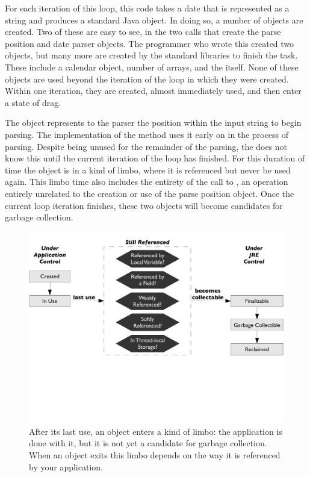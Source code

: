 For each iteration of this loop, this code takes a date that is represented as a
string and produces a standard Java  object. In doing so, a number of
objects are created. Two of these are easy to see, in the two  calls
that create the parse position and date parser objects. The programmer who wrote
this created two objects, but many more are created by the standard libraries to
finish the task. These include a calendar object, number of arrays, and the
 itself. None of these objects are used beyond the iteration of the
loop in which they were created. Within one iteration, they are created, almost
immediately used, and then enter a state of drag.


The  object represents to the parser the position within the input
string to begin parsing. The implementation of the  method uses it
early on in the process of parsing. Despite being unused for the remainder of the
parsing, the \jre does not know this until the current iteration of the loop has
finished. For this duration of time the object is in a kind of limbo, where it is
referenced but never be used again. This limbo time also includes the entirety of
the call to , an operation entirely unrelated to the
creation or use of the parse position object. Once the current loop iteration
finishes, these two objects will become candidates for garbage collection.

\begin{figure}
	\centering
	\includegraphics[width=\textwidth]{part2/Figures/lifetime/states}
	\caption{After its last use, an object enters a kind of limbo: the application
	is done with it, but it is not yet a candidate for garbage collection. When an
	object exits this limbo depends on the way it is referenced by your
	application.}
		\label{fig:limbo-exit}
\end{figure}

